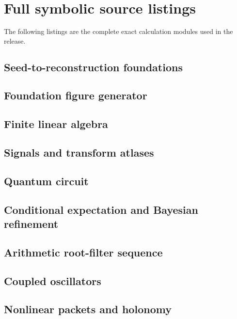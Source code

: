 \documentclass[11pt,oneside]{book}
\theoremstyle{definition}
\theoremstyle{remark}
\begin{document}
\chapter{Full symbolic source listings}
The following listings are the complete exact calculation modules used in the release.

\section{Seed-to-reconstruction foundations}


\section{Foundation figure generator}


\section{Finite linear algebra}


\section{Signals and transform atlases}


\section{Quantum circuit}


\section{Conditional expectation and Bayesian refinement}


\section{Arithmetic root-filter sequence}


\section{Coupled oscillators}


\section{Nonlinear packets and holonomy}

\end{document}
